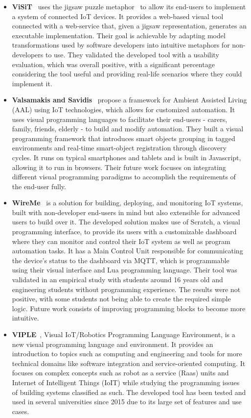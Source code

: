 \begin{itemize}
\item\textbf{ViSiT}~\cite{visit} uses the jigsaw puzzle metaphor~\cite{jigsaw03} to allow its end-users to implement a system of connected IoT devices. It provides a web-based visual tool connected with a web-service that, given a jigsaw representation, generates an executable implementation. Their goal is achievable by adapting model transformations used by software developers into intuitive metaphors for non-developers to use. They validated the developed tool with a usability evaluation, which was overall positive, with a significant percentage considering the tool useful and providing real-life scenarios where they could implement it.

\item\textbf{Valsamakis and Savidis}~\cite{Valsamakis2017} propose a framework for Ambient Assisted Living (AAL) using IoT technologies, which allows for customized automation. It uses visual programming languages to facilitate their end-users - carers, family, friends, elderly - to build and modify automation. They built a visual programming framework that introduces smart objects grouping in tagged environments and real-time smart-object registration through discovery cycles. It runs on typical smartphones and tablets and is built in Javascript, allowing it to run in browsers. Their future work focuses on integrating different visual programming paradigms to accomplish the requirements of the end-user fully.

\item\textbf{WireMe}~\cite{wireme} is a solution for building, deploying, and monitoring IoT systems, built with non-developer end-users in mind but also extensible for advanced users to build over it. The developed solution makes use of Scratch, a visual programming interface, to provide its users with a customizable dashboard where they can monitor and control their IoT system as well as program automation tasks. It has a Main Control Unit responsible for communicating the device's status to the dashboard via MQTT, which is programmable using their visual interface and Lua programming language. Their tool was validated in an empirical study with students around 16 years old and engineering students without programming experience. The results were not positive, with some students not being able to create the required simple logic. Future work consists of improving programming blocks to become more intuitive.

\item\textbf{VIPLE}~\cite{viple}, Visual IoT/Robotics Programming Language Environment, is a new visual programming language and environment. It provides an introduction to topics such as computing and engineering and tools for more technical domains like software integration and service-oriented computing. It focuses on complex concepts such as robot as a service (Raas) units and Internet of Intelligent Things (IoIT) while studying the programming issues of building systems classified as such. The developed tool has been tested and used in several universities since 2015 due to its large set of features and use cases.


\end{itemize}
